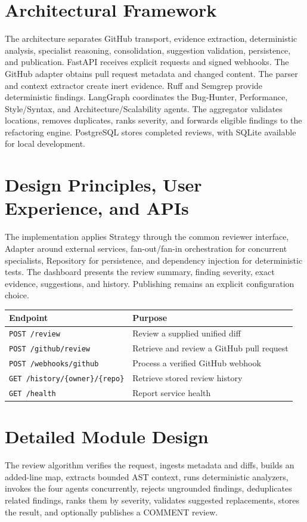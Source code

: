 \documentclass[11pt,a4paper]{article}
\begin{document}
\section{Architectural Framework}
The architecture separates GitHub transport, evidence extraction, deterministic analysis, specialist reasoning, consolidation, suggestion validation, persistence, and publication. FastAPI receives explicit requests and signed webhooks. The GitHub adapter obtains pull request metadata and changed content. The parser and context extractor create inert evidence. Ruff and Semgrep provide deterministic findings. LangGraph coordinates the Bug-Hunter, Performance, Style/Syntax, and Architecture/Scalability agents. The aggregator validates locations, removes duplicates, ranks severity, and forwards eligible findings to the refactoring engine. PostgreSQL stores completed reviews, with SQLite available for local development.

\section{Design Principles, User Experience, and APIs}
The implementation applies Strategy through the common reviewer interface, Adapter around external services, fan-out/fan-in orchestration for concurrent specialists, Repository for persistence, and dependency injection for deterministic tests. The dashboard presents the review summary, finding severity, exact evidence, suggestions, and history. Publishing remains an explicit configuration choice.

\begin{table}[h]
\centering
\begin{tabular}{ll}
\toprule
Endpoint & Purpose \\
\midrule
\texttt{POST /review} & Review a supplied unified diff \\
\texttt{POST /github/review} & Retrieve and review a GitHub pull request \\
\texttt{POST /webhooks/github} & Process a verified GitHub webhook \\
\texttt{GET /history/\{owner\}/\{repo\}} & Retrieve stored review history \\
\texttt{GET /health} & Report service health \\
\bottomrule
\end{tabular}
\end{table}

\section{Detailed Module Design}
The review algorithm verifies the request, ingests metadata and diffs, builds an added-line map, extracts bounded AST context, runs deterministic analyzers, invokes the four agents concurrently, rejects ungrounded findings, deduplicates related findings, ranks them by severity, validates suggested replacements, stores the result, and optionally publishes a COMMENT review.
\end{document}
